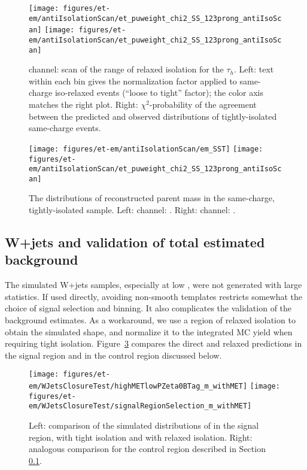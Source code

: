 \begin{figure}\centering
  \texttt{[image: figures/et-em/antiIsolationScan/et\_puweight\_chi2\_SS\_123prong\_antiIsoScan]} %
  \texttt{[image: figures/et-em/antiIsolationScan/et\_puweight\_chi2\_SS\_123prong\_antiIsoScan]} %
  \caption{\label{fig:et_scans} \teth channel: scan of the range of
    relaxed isolation for the $\tau_h$.  Left: text within each bin
    gives the normalization factor applied to same-charge iso-relaxed
    events (``loose to tight'' factor); the color axis matches the
    right plot.  Right: $\chi^2$-probability of the agreement between
    the predicted and observed distributions of tightly-isolated
    same-charge events.}
\end{figure}

\begin{figure}\centering
  \texttt{[image: figures/et-em/antiIsolationScan/em\_SST]}
  \texttt{[image: figures/et-em/antiIsolationScan/et\_puweight\_chi2\_SS\_123prong\_antiIsoScan]} %
  \caption{\label{fig:sst} The distributions of reconstructed parent
    mass in the same-charge, tightly-isolated sample.  Left: \tetm
    channel: \meffemu.  Right: \teth channel: \meffetau.}
\end{figure}


\subsection{W+jets and validation of total estimated background}
\label{sec:et_w_bkg_validation}

The simulated W+jets samples, especially at low \HT, were not
generated with large statistics.  If used directly, avoiding
non-smooth templates restricts somewhat the choice of signal selection
and binning.  It also complicates the validation of the background
estimates.  As a workaround, we use a region of relaxed \tauh
isolation to obtain the simulated shape, and normalize it to the
integrated MC yield when requiring tight \tauh isolation.
Figure~\ref{fig:et-w-shape} compares the direct and relaxed
predictions in the signal region and in the control region discussed
below. 

\begin{figure}\centering
  \texttt{[image: figures/et-em/WJetsClosureTest/highMETlowPZeta0BTag\_m\_withMET]}
  \texttt{[image: figures/et-em/WJetsClosureTest/signalRegionSelection\_m\_withMET]}
  \caption{\label{fig:et-w-shape} Left: comparison of the simulated
    distributions of \meffetau in the signal region, with tight \tauh
    isolation and with relaxed \tauh isolation.  Right: analogous
    comparison for the control region described in Section~
    \ref{sec:et_w_bkg_validation}.}
\end{figure}


